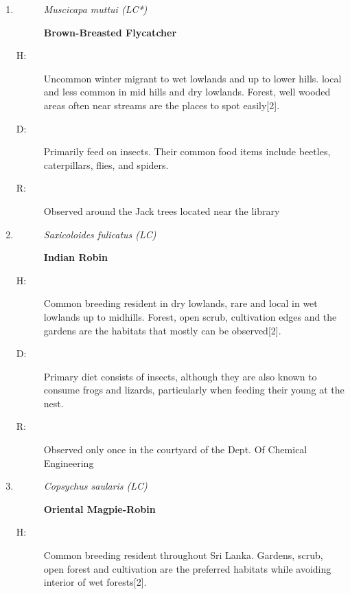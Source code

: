 \begin{itemize}
\begin{enumerate}
\begin{description}
\end{description}%
\item%
\begin{description}%
\item[]%
\textit{Muscicapa muttui (LC*)}%
\item[]%
\textbf{Brown{-}Breasted Flycatcher}%
\end{description}%
\begin{description}%
\item[H: ]%
Uncommon winter migrant to wet lowlands and up to lower hills. local and less common in mid hills and dry lowlands. Forest, well wooded areas often near streams are the places to spot easily{[}2{]}.%
\item[D: ]%
Primarily feed on insects. Their common food items include beetles, caterpillars, flies, and spiders.%
\item[R: ]%
Observed around the Jack trees located near the library%
\end{description}%
\item%
\begin{description}%
\item[]%
\textit{Saxicoloides fulicatus (LC)}%
\item[]%
\textbf{Indian Robin}%
\end{description}%
\begin{description}%
\item[H: ]%
Common breeding resident in dry lowlands, rare and local in wet lowlands up to midhills. Forest, open scrub, cultivation edges and the gardens are the habitats that mostly can be observed{[}2{]}.%
\item[D: ]%
Primary diet consists of insects, although they are also known to consume frogs and lizards, particularly when feeding their young at the nest.%
\item[R: ]%
Observed only once in the courtyard of the Dept. Of Chemical Engineering%
\end{description}%
\item%
\begin{description}%
\item[]%
\textit{Copsychus saularis (LC)}%
\item[]%
\textbf{Oriental Magpie{-}Robin}%
\end{description}%
\begin{description}%
\item[H: ]%
Common breeding resident throughout Sri Lanka. Gardens, scrub, open forest and cultivation are the preferred habitats while avoiding interior of wet forests{[}2{]}.%

\end{description}
\end{enumerate}
\end{itemize}

